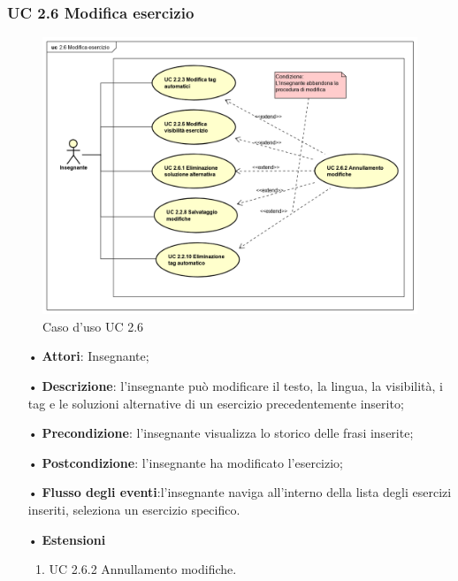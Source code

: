 \subsubsection{UC 2.6 Modifica esercizio}
\begin{figure}[H]
\centering
\includegraphics[width=17cm]{img/UC26.png} 
\caption{Caso d'uso UC 2.6}
\end{figure}

\begin{itemize}
	\item[•] \textbf{Attori}: Insegnante;
	\item[•] \textbf{Descrizione}: l’insegnante può modificare il testo, la lingua, la visibilità, i tag e le soluzioni alternative di un esercizio precedentemente inserito;
	\item[•] \textbf{Precondizione}: l'insegnante visualizza lo storico delle frasi inserite;
	\item[•] \textbf{Postcondizione}: l’insegnante ha modificato l'esercizio;
	\item[•] \textbf{Flusso degli eventi}:l’insegnante naviga all’interno della lista degli esercizi inseriti, seleziona un esercizio specifico.
	\item[•] \textbf{Estensioni}
	\begin{enumerate}
		\item UC 2.6.2 Annullamento modifiche.
	\end{enumerate}
\end{itemize}   

